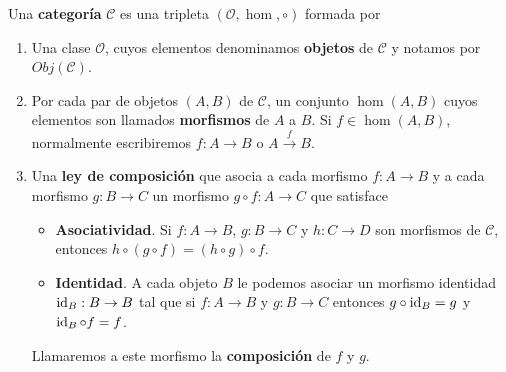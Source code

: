 \begin{definicion}
	Una \textbf{categoría} $\mathcal{C}$ es una tripleta $(\mathcal{O}, \hom, \circ)$ formada por
	\begin{enumerate}
		\item Una clase $\mathcal{O}$, cuyos elementos denominamos \textbf{objetos} de $\mathcal{C}$ y notamos por $Obj(\mathcal{C})$.
		\item Por cada par de objetos $(A,B)$ de $\mathcal{C}$, un conjunto $\hom(A,B)$ cuyos elementos son llamados \textbf{morfismos} de $A$ a $B$. Si $f \in \hom(A,B)$, normalmente escribiremos $f: A \rightarrow B$ o $A \xrightarrow{f} B$.
		\item Una \textbf{ley de composición} que asocia a cada morfismo $f: A \rightarrow B$ y a cada morfismo $g: B \rightarrow C$ un morfismo $g \circ f : A \rightarrow C$ que satisface
		\begin{itemize}
			\item \textbf{Asociatividad}. Si $f: A \rightarrow B$, $g: B \rightarrow C$ y $h : C \rightarrow D$ son morfismos de $\mathcal{C}$, entonces $h \circ (g \circ f) = (h \circ g) \circ f$.
			\item \textbf{Identidad}. A cada objeto $B$ le podemos asociar un morfismo identidad $\operatorname{id}_B : B \rightarrow B$ tal que si $f: A \rightarrow B$ y $g: B \rightarrow C$ entonces $g \circ \operatorname{id}_B = g$ y $\operatorname{id}_B \circ f = f$.
		\end{itemize}
		Llamaremos a este morfismo la \textbf{composición} de $f$ y $g$.
	\end{enumerate}
\end{definicion}

